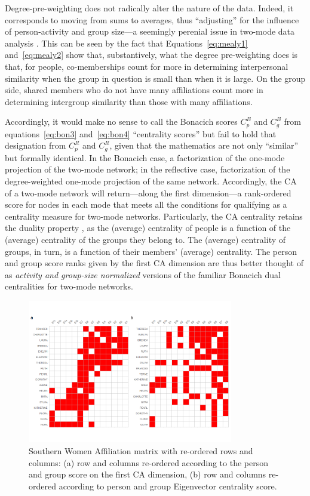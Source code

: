 \documentclass[a4paper,fleqn]{cas-sc}
\begin{document}
Degree-pre-weighting does not radically alter the nature of the data. Indeed, it corresponds to moving from sums to averages, thus ``adjusting'' for the influence of person-activity and group size---a seemingly perenial issue in two-mode data analysis \citep[159ff]{bonacich1991simultaneous}. This can be seen by the fact that Equations~\ref{eq:mealy1} and~\ref{eq:mealy2} show that, substantively, what the degree pre-weighting does is that, for people, co-memberships count for more in determining interpersonal similarity when the group in question is small than when it is large. On the group side, shared members who do not have many affiliations count more in determining intergroup similarity than those with many affiliations. 

Accordingly, it would make no sense to call the Bonacich scores $C^B_p$ and $C^B_g$ from equations~\ref{eq:bon3} and~\ref{eq:bon4} ``centrality scores'' but fail to hold that designation from $C^R_p$ and $C^R_g$, given that the mathematics are not only ``similar'' \citep[162]{bonacich1991simultaneous} but formally identical. In the Bonacich case, a factorization of the one-mode projection of the two-mode network; in the reflective case, factorization of the degree-weighted one-mode projection of the same network. Accordingly, the CA of a two-mode network will return---along the first dimension---a rank-ordered score for nodes in each mode that meets all the conditions for qualifying as a centrality measure for two-mode networks. Particularly, the CA centrality retains the duality property \citep[128]{faust2005using}, as the (average) centrality of people is a function of the (average) centrality of the groups they belong to. The (average) centrality of groups, in turn, is a function of their members' (average) centrality. The person and group score ranks given by the first CA dimension are thus better thought of as \textit{activity and group-size normalized} versions of the familiar Bonacich \citeyearpar{bonacich1991simultaneous} dual centralities for two-mode networks.

\begin{figure}
    \centering
    \includegraphics[width=0.8\textwidth]{Plots/ca-v-bon-reord.png}
    \caption{Southern Women Affiliation matrix with re-ordered rows and columns: (a) row and columns re-ordered according to the person and group score on the first CA dimension, (b) row and columns re-ordered according to person and group Eigenvector centrality score.}
    \label{fig:ca-v-bon}
\end{figure}
\end{document}
